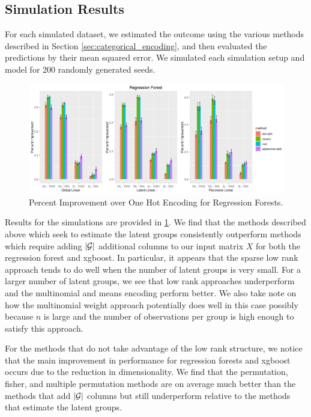 \documentclass{article}
\theoremstyle{plain}
\theoremstyle{definition}
\theoremstyle{remark}
\begin{document}
\subsection{Simulation Results}
\label{sec:simulation_results}

For each simulated dataset, we estimated the outcome using the various methods described in Section \ref{sec:categorical_encoding}, and then evaluated the predictions by their mean squared error. We simulated each simulation setup and model for 200 randomly generated seeds.


\begin{figure}[htbp]
	\centering
	\includegraphics[width=\linewidth]{figures/rf_final.png}
	\caption {Percent Improvement over One Hot Encoding for Regression Forests.}
	\label{tab:rf_sim_setups}
\end{figure}

Results for the simulations are provided in \ref{tab:rf_sim_setups}. We find that the methods described above which seek to estimate the latent groups consistently outperform methods which require adding $|\mathcal{G}|$ additional columns to our input matrix $X$ for both the regression forest and xgboost. In particular, it appears that the sparse low rank approach tends to do well when the number of latent groups is very small. For a larger number of latent groups, we see that low rank approaches underperform and the multinomial and means encoding perform better. We also take note on how the multinomial weight approach potentially does well in this case possibly because $n$ is large and the number of observations per group is high enough to satisfy this approach.

For the methods that do not take advantage of the low rank structure, we notice that the main improvement in performance for regression forests and xgboost occurs due to the reduction in dimensionality. We find that the permutation, fisher, and multiple permutation methods are on average much better than the methods that add $|\mathcal{G}|$ columns but still underperform relative to the methods that estimate the latent groups.
\end{document}
